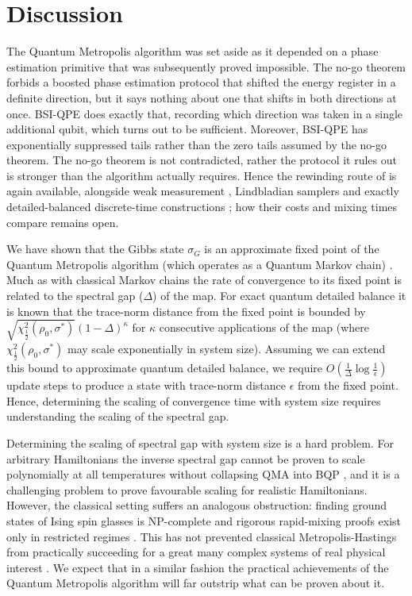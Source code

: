 \documentclass[aps,floatfix,10pt,amssymb,amsfont,amsmath,superscriptaddress,float,nofootinbib,longbibliography,nobalancelastpage,twocolumn]{revtex4-2}
\begin{document}
\section{Discussion}
\label{section:discussion}
The Quantum Metropolis algorithm was set aside as it depended on a phase
estimation primitive that was subsequently proved impossible. The no-go theorem \cite{chen2023quantumthermalstatepreparation} forbids a boosted phase estimation protocol that shifted the energy register in a definite direction, but it says nothing about one that shifts in both directions at once. BSI-QPE does exactly that, recording which direction was taken in a single additional qubit, which turns out to be sufficient. Moreover, BSI-QPE has exponentially suppressed tails rather than the zero tails assumed by the no-go theorem. The no-go theorem is not contradicted, rather the protocol it rules out is stronger than the algorithm actually requires. Hence the rewinding route of \cite{Temme_2011} is again available, alongside weak measurement \cite{jiang2024quantummetropolissamplingweak}, Lindbladian samplers and exactly detailed-balanced discrete-time constructions \cite{gilyen2024quantum}; how their costs and mixing times compare remains open.

We have shown that the Gibbs state $\sigma_G$ is an approximate fixed point of the Quantum Metropolis algorithm (which operates as a Quantum Markov chain) . Much as with classical Markov chains the rate of convergence to its fixed point is related to the spectral gap ($\Delta$) of the map. For exact quantum detailed balance it is known \cite{temme2010chi} that the trace-norm distance from the fixed point is bounded by $\sqrt{\chi^2_{\frac{1}{2}}(\rho_0,\sigma^*)} (1-\Delta)^\kappa$ for $\kappa$ consecutive applications of the map (where $\chi^2_{\frac{1}{2}}(\rho_0,\sigma^*)$ may scale exponentially in system size). Assuming we can extend this bound to approximate quantum detailed balance, we require $O(\frac{1}{\Delta}\log \frac{1}{\epsilon})$ update steps to produce a state with trace-norm distance $\epsilon$ from the fixed point. Hence, determining the scaling of convergence time with system size requires understanding the scaling of the spectral gap.

Determining the scaling of spectral gap with system size is a hard problem. For arbitrary Hamiltonians the inverse spectral gap cannot be proven to scale polynomially at all temperatures without collapsing QMA into BQP \cite{oliveira2008complexityquantumspinsystems, Aharonov_2009, Schuch_2009}, and it is a challenging problem to prove favourable scaling for realistic Hamiltonians. However, the classical setting suffers an analogous obstruction: finding ground states of Ising spin glasses is NP-complete \cite{Barahona:1982zdv} and rigorous rapid-mixing proofs exist only in restricted regimes \cite{Martinelli1999}. This has not prevented classical Metropolis-Hastings from practically succeeding for a great many complex systems of real physical interest \cite{thijssen2007computational}. We expect that in a similar fashion the practical achievements of the Quantum Metropolis algorithm will far outstrip what can be proven about it. 
 
\end{document}

